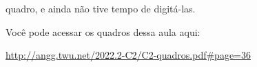 \documentclass[oneside,12pt]{article}
\begin{document}
quadro, e ainda não tive tempo de digitá-las.

Você pode acessar os quadros dessa aula aqui:

\ssk

{\scriptsize

\url{http://angg.twu.net/2022.2-C2/C2-quadros.pdf\#page=36}

}

\ssk






\end{document}
